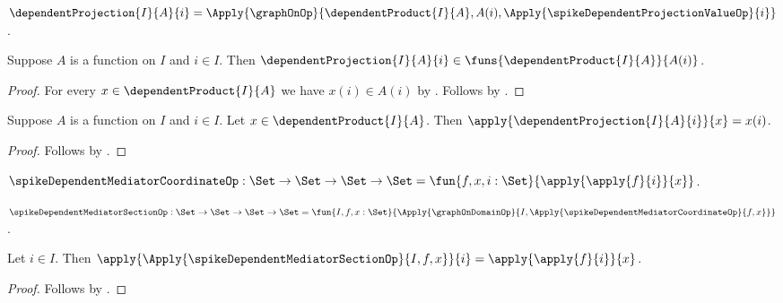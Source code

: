 \begin{definition}\label{spike_dependent_projection}
    $\dependentProjection{I}{A}{i}
        =\Apply{\graphOnOp}{
            \dependentProduct{I}{A},A(i),
            \Apply{\spikeDependentProjectionValueOp}{i}}$.
\end{definition}

\begin{proposition}\label{spike_dependent_projection_type}
    Suppose $A$ is a function on $I$ and $i\in I$.
    Then
        $\dependentProjection{I}{A}{i}\in
            \funs{\dependentProduct{I}{A}}{A(i)}$.
\end{proposition}
\begin{proof}
    For every $x\in\dependentProduct{I}{A}$ we have $x(i)\in A(i)$ by
        .
    Follows by
        .
\end{proof}

\begin{proposition}\label{spike_dependent_projection_apply}
    Suppose $A$ is a function on $I$ and $i\in I$.
    Let $x\in\dependentProduct{I}{A}$.
    Then $\apply{\dependentProjection{I}{A}{i}}{x}=x(i)$.
\end{proposition}
\begin{proof}
    Follows by
        .
\end{proof}

\begin{definition}\label{spike_dependent_mediator_coordinate_op}
    $\spikeDependentMediatorCoordinateOp:
        \Set\to\Set\to\Set\to\Set
        =\fun{f,x,i:\Set}{\apply{\apply{f}{i}}{x}}$.
\end{definition}

\begin{definition}\label{spike_dependent_mediator_section_op}
    $\spikeDependentMediatorSectionOp:
        \Set\to\Set\to\Set\to\Set
        =\fun{I,f,x:\Set}{
            \Apply{\graphOnDomainOp}{
                I,\Apply{\spikeDependentMediatorCoordinateOp}{f,x}}}$.
\end{definition}

\begin{proposition}\label{spike_dependent_mediator_section_coordinate}
    Let $i\in I$.
    Then
        $\apply{\Apply{\spikeDependentMediatorSectionOp}{I,f,x}}{i}
            =\apply{\apply{f}{i}}{x}$.
\end{proposition}
\begin{proof}
    Follows by
        .
\end{proof}

